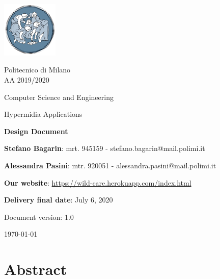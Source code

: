 \documentclass[11pt, a4paperm, hidelinks]{article}
\begin{document}
	\begin{titlepage}
		\centering
		\includegraphics[width=0.20\textwidth]{./assets/polimi-logo.png}\par

		{Politecnico di Milano \\ AA 2019/2020} \par
		\vspace{1.5cm}

		{Computer Science and Engineering}\par
		\Large{Hypermidia Applications}\par
		\vspace{1.0cm}

		{\LARGE \textbf{Design Document} \par}
		\vspace{1.5cm}

		{\normalsize {\textbf{Stefano Bagarin}: mrt. 945159 -  stefano.bagarin@mail.polimi.it }\par}
		\vspace{0.2cm}
		{\normalsize{\textbf{Alessandra Pasini}: mtr. 920051 - alessandra.pasini@mail.polimi.it}\par}
		\vspace{1.0cm}
		
		{\normalsize {\textbf{Our website}: \url{https://wild-care.herokuapp.com/index.html}}\par}
		\vspace{0.2cm}
		{\normalsize {\textbf{Delivery final date}: July 6, 2020}\par}
		\vfill

		{\large Document version: 1.0\par}
		{\large \today \par}
	\end{titlepage}

	\tableofcontents
	\clearpage


	\section{Abstract}
	
	\clearpage
\end{document}
